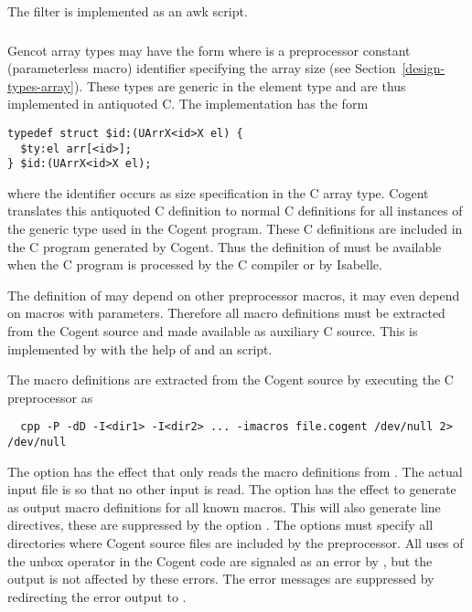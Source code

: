 The filter is implemented as an awk script.

\subsubsection{}

Gencot array types may have the form  where  is a preprocessor constant (parameterless macro) 
identifier specifying the array size (see Section~\ref{design-types-array}). These types are generic in the element type 
and are thus implemented in antiquoted C. The implementation has the form 
\begin{verbatim}
typedef struct $id:(UArrX<id>X el) {
  $ty:el arr[<id>];
} $id:(UArrX<id>X el);
\end{verbatim}
where the identifier  occurs as size specification in the C array type. Cogent translates this antiquoted 
C definition to normal C definitions for all instances of the generic type used in the Cogent program. These C definitions
are included in the C program generated by Cogent.
Thus the definition of  must be available when the C program is processed by the C compiler or by Isabelle.

The definition of  may depend on other preprocessor macros, it may even depend on macros with parameters.
Therefore all macro definitions must be extracted from the Cogent source and made available as auxiliary C source.
This is implemented by  with the help of  and an  script.

The macro definitions are extracted from the Cogent source  by executing the C preprocessor as
\begin{verbatim}
  cpp -P -dD -I<dir1> -I<dir2> ... -imacros file.cogent /dev/null 2> /dev/null
\end{verbatim}
The option  has the effect that  only reads the macro definitions from .
The actual input file is  so that no other input is read. The option  has the effect
to generate as output macro definitions for all known macros. This will also generate line directives, these are
suppressed by the option . The  options must specify all directories where Cogent source files
are included by the preprocessor. All uses of the unbox operator \code{\#} in the Cogent code are signaled as an 
error by , but the output is not affected by these errors. The error messages are suppressed by redirecting
the error output to .

